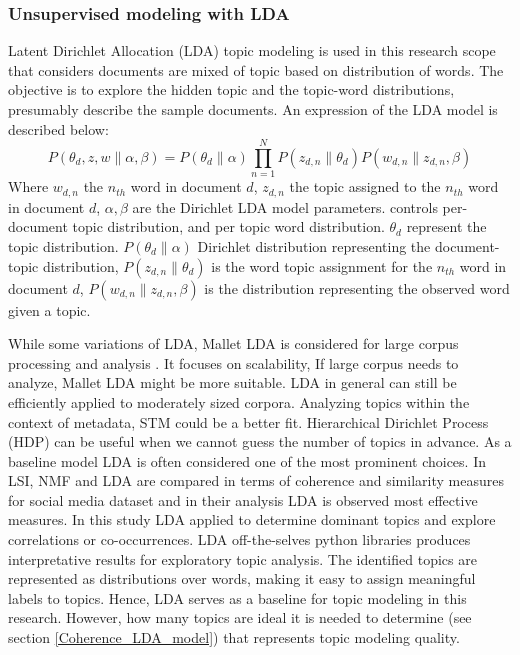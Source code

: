 \documentclass[sn-mathphys,Numbered]{sn-jnl}%
\theoremstyle{thmstyleone}%
\theoremstyle{thmstyletwo}%
\theoremstyle{thmstylethree}%
\begin{document}
\subsubsection{Unsupervised modeling with LDA}
\label{lda_mdel}
Latent Dirichlet Allocation (LDA) topic modeling \cite{jelodar_latent_2019, gupta_pan_lda_2021, pichardo_lagunas_svd_lda_2015, selvi_classification_2019} is used in this research scope that considers documents are mixed of topic based on distribution of words. The objective is to explore the hidden topic and the topic-word distributions, presumably describe the sample documents. An expression of the LDA model is described below:  
\begin{equation}
P(\theta_d,z,w\|\alpha,\beta)=P(\theta_d\|\alpha)\prod^N_{n=1}P(z_{d,n}\|\theta_d)P(w_{d,n}\|z_{d,n},\beta)
\end{equation}
Where $w_{d,n}$ the $n_{th}$ word in document $d$, $z_{d,n}$ the topic assigned to the $n_{th}$ word in document $d$, $\alpha,\beta$ are the Dirichlet LDA model parameters. controls per-document topic distribution, and per topic word distribution. $\theta_d$ represent the topic distribution. $P(\theta_d \| \alpha)$ Dirichlet 
distribution representing the document-topic distribution, $P(z_{d,n}\|\theta_d)$ is the word topic assignment for the $n_{th}$ word in document $d$, $P(w_{d,n}\|z_{d,n},\beta)$ is the distribution representing the observed word given a topic. 

While some variations of LDA, Mallet LDA is considered for large corpus processing and analysis \cite{vayansky2020review, abdelrazek2022topic, Comparison_Topic_Modeling_Algorithms}. It focuses on scalability, If large corpus needs to analyze, Mallet LDA might be more suitable. LDA in general can still be efficiently applied to moderately sized corpora. Analyzing topics within the context of metadata, STM could be a better fit. Hierarchical Dirichlet Process (HDP) can be useful when we cannot guess the number of topics in advance. As a baseline model LDA is often considered one of the most prominent choices. In \cite{Comparison_Topic_Modeling_Algorithms} LSI, NMF and LDA are compared in terms of coherence and similarity measures for social media dataset and in their analysis LDA is observed most effective measures. In this study LDA applied to determine dominant topics and explore correlations or co-occurrences. LDA off-the-selves python libraries produces interpretative results for exploratory topic analysis. The identified topics are represented as distributions over words, making it easy to assign meaningful labels to topics. Hence, LDA serves as a baseline for topic modeling in this research. However, how many topics are ideal it is needed to determine (see section \ref{Coherence_LDA_model}) that represents topic modeling quality.
\end{document}
